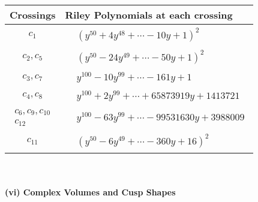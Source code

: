\documentclass[1p]{elsarticle_modified}
\theoremstyle{definition}
\begin{document}
\begin{tabular}{m{50pt}|m{274pt}}
Crossings & \hspace{64pt}Riley Polynomials at each crossing \\
\hline $$\begin{aligned}c_{1}\end{aligned}$$&$\begin{aligned}
&(y^{50}+4 y^{48}+\cdots-10 y+1)^{2}
\end{aligned}$\\
\hline $$\begin{aligned}c_{2},c_{5}\end{aligned}$$&$\begin{aligned}
&(y^{50}-24 y^{49}+\cdots-50 y+1)^{2}
\end{aligned}$\\
\hline $$\begin{aligned}c_{3},c_{7}\end{aligned}$$&$\begin{aligned}
&y^{100}-10 y^{99}+\cdots-161 y+1
\end{aligned}$\\
\hline $$\begin{aligned}c_{4},c_{8}\end{aligned}$$&$\begin{aligned}
&y^{100}+2 y^{99}+\cdots+65873919 y+1413721
\end{aligned}$\\
\hline $$\begin{aligned}c_{6},c_{9},c_{10}\\c_{12}\end{aligned}$$&$\begin{aligned}
&y^{100}-63 y^{99}+\cdots-99531630 y+3988009
\end{aligned}$\\
\hline $$\begin{aligned}c_{11}\end{aligned}$$&$\begin{aligned}
&(y^{50}-6 y^{49}+\cdots-360 y+16)^{2}
\end{aligned}$\\
\hline
\end{tabular}\\~\\
\newpage\flushleft \textbf{(vi) Complex Volumes and Cusp Shapes}
\end{document}
